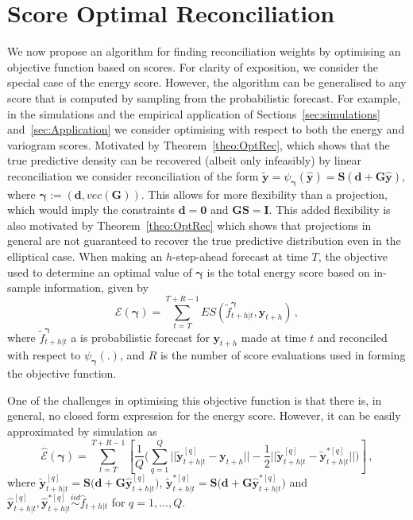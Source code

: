 \documentclass[a4paper,12pt]{article}
\theoremstyle{definition}
\begin{document}
\section{Score Optimal Reconciliation}\label{sec:scoreoptSGD}

We now propose an algorithm for finding reconciliation weights by optimising an objective function based on scores. For clarity of exposition, we consider the special case of the energy score. However, the algorithm can be generalised to any score that is computed by sampling from the probabilistic forecast. For example, in the simulations and the empirical application of Sections~\ref{sec:simulations} and~\ref{sec:Application} we consider optimising with respect to both the energy and variogram scores. Motivated by Theorem~\ref{theo:OptRec}, which shows that the true predictive density can be recovered (albeit only infeasibly) by linear reconciliation we consider reconciliation of the form $\tilde{\bm{y}}=\psi_{\bm{\gamma}}({\bm{\hat{y}}})={\bm{S}}\left(\bm{d}+\bm{G}{\bm{\hat{y}}}\right)$, where ${\bm\gamma}:=\left(\bm{d},vec(\bm{G})\right)$. This allows for more flexibility than a projection, which would imply the constraints $\bm{d}=\bm{0}$ and $\bm{G}\bm{S}=\bm{I}$. This added flexibility is also motivated by Theorem~\ref{theo:OptRec} which shows that projections in general are not guaranteed to recover the true predictive distribution even in the elliptical case. When making an $h$-step-ahead forecast at time $T$, the objective used to determine an optimal value of $\bm{\gamma}$ is the total energy score based on in-sample information, given by
\begin{equation}
\mathcal{E}\left(\bm{\gamma}\right)=\sum\limits_{t=T}^{T+R-1} \textit{ES}(\tilde{f}^{\bm{\gamma}}_{t+h|t},\bm{y}_{t+h})\,,
\label{eq:tes}
\end{equation}
where $\tilde{f}^{\bm{\bm{\gamma}}}_{t+h|t}$ a is probabilistic forecast for $\bm{y}_{t+h}$ made at time $t$ and reconciled with respect to $\psi_{\bm{\gamma}}(.)$, and $R$ is the number of score evaluations used in forming the objective function.

One of the challenges in optimising this objective function is that there is, in general, no closed form expression for the energy score. However, it can be easily approximated by simulation as
\begin{equation}
\hat{\mathcal{E}}\left(\bm{\gamma}\right)=\sum\limits_{t=T}^{T+R-1}\left[\frac{1}{Q}\bigg(\sum\limits_{q=1}^{Q}||\tilde{\bm{y}}^{[q]}_{t+h|t}-\bm{y}_{t+h}||-\frac{1}{2}||\tilde{\bm{y}}_{t+h|t}^{[q]}-\tilde{\bm{y}}^{*[q]}_{t+h|t}||\bigg)\right]\,,
\label{eq:obj_mc}
\end{equation}
where $\tilde{\bm{y}}^{[q]}_{t+h|t}=\bm{S}\big(\bm{d}+\bm{G}{\hat{\bm{y}}}^{[q]}_{t+h|t}\big)$, $\tilde{\bm{y}}^{*[q]}_{t+h|t}=\bm{S}\big(\bm{d}+\bm{G}{\hat{\bm{y}}}^{*[q]}_{t+h|t}\big)$ and ${\hat{\bm{y}}}^{[q]}_{t+h|t},{\hat{\bm{y}}}^{*[q]}_{t+h|t}\overset{iid}{\sim} \hat{f}_{t+h|t}$ for $q=1,\ldots,Q$.
\end{document}
